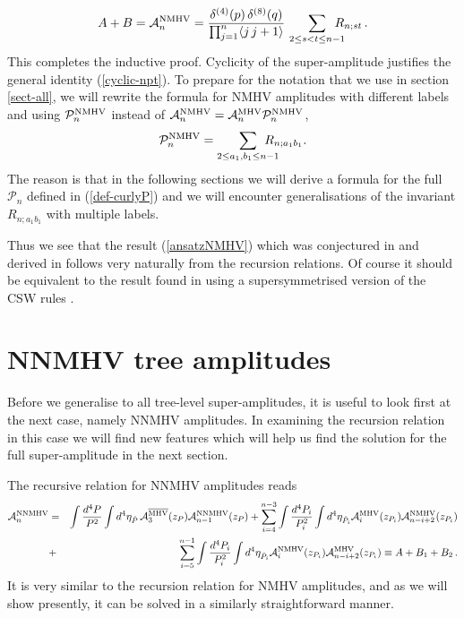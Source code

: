 \documentclass[12pt]{article}
\def \be  {\begin{equation}}
\def \ee  {\end{equation}}
\def \ba  {\begin{eqnarray}}
\def \ea  {\end{eqnarray}}
\newcommand \widebar [1] {\overline{#1}}
\begin{document}
\be A+B = {\cal A}^{\rm {NMHV}}_{n} = \frac{
\delta^{(4)}(p) \, \delta^{(8)}(q)}{\prod_{j=1}^{n} \langle j \,
j+1 \rangle } \, \sum_{2\leq s< t \leq n-1} \!\!\!\!\!\! R_{n;st} \,.
\ee
This
completes the inductive proof. Cyclicity of the super-amplitude
justifies the general identity (\ref{cyclic-npt}).
To prepare for the notation that we use in section \ref{sect-all}, we will rewrite the formula for NMHV amplitudes with different labels and using $\mathcal{P}_n^{\rm NMHV}$ instead of $\mathcal{A}_n^{\rm NMHV} = \mathcal{A}_n^{\rm MHV} \mathcal{P}_n^{\rm NMHV}$,
\be
\label{PNMHV}
\mathcal{P}_n^{\rm NMHV} = \sum_{2 \leq a_1,b_1 \leq n-1} \!\!\!\!\!\!\!\! R_{n;a_1b_1}.
\ee
The reason is that in the following sections we will derive a formula for the full $\mathcal{P}_n$ defined in (\ref{def-curlyP}) and we will encounter generalisations of the invariant $R_{n;a_1b_1}$ with multiple labels.

Thus we see that the result (\ref{ansatzNMHV}) which was conjectured in \cite{dhks5} and derived in \cite{dhks6} follows very naturally from the recursion relations. Of course it should be equivalent to the result found in \cite{Georgiou:2004by} using a supersymmetrised version of the CSW rules \cite{Cachazo:2004kj}.




\section{NNMHV tree amplitudes}\label{sect-NNMHV}

Before we generalise to all tree-level super-amplitudes, it is useful
to look first at the next case, namely NNMHV amplitudes. In examining
the recursion relation in this case we will find new features which
will help us find the solution for the full super-amplitude in the
next section.


The recursive relation for NNMHV amplitudes reads
\ba
\label{super-BCF-NNMHV}
\mathcal{A}_{n}^{\rm NNMHV} &=& \int
\frac{d^{4}P}{P^2} \int d^{4} \eta_{\hat{P}} \,
\mathcal{A}_{3}^{\rm \widebar{MHV}}(z_{P}) \mathcal{A}_{n-1}^{\rm
NNMHV}(z_{P}) + \sum_{i=4}^{n-3}  \int \frac{d^{4}P_{i}}{P_{i}^2}
\int d^{4}\eta_{\hat{P}_{i}} \mathcal{A}_{i}^{\rm MHV}(z_{P_{i}})
\mathcal{A}_{n-i+2}^{\rm NMHV}(z_{P_{i}}) \nonumber \\ &+&
\sum_{i=5}^{n-1}  \int \frac{d^{4}P_{i}}{P_{i}^2} \int
d^{4}\eta_{\hat{P}_{i}} \mathcal{A}_{i}^{\rm NMHV}(z_{P_{i}})
\mathcal{A}_{n-i+2}^{\rm MHV}(z_{P_{i}}) \equiv A +B_1 + B_2\,.
\ea
It is very similar to
the recursion relation for NMHV amplitudes, and as we will show
presently, it can be solved in a similarly straightforward manner.
\end{document}
